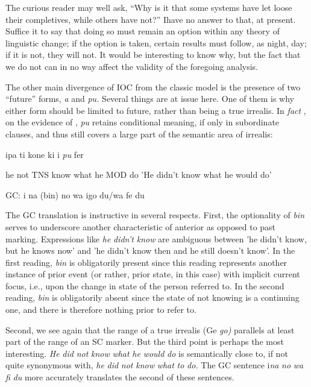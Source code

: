 The curious reader may well ask, ``Why is it that some systems
have let loose their completives, while others have not?'' Ihave no answer to that, at present. Suffice it to say that doing so must remain an option within any theory of linguistic change; if the option is taken, certain results must follow, as night, day; if it is not, they will not. It would be interesting to know why, but the fact that we do not can in no way affect the validity of the foregoing analysis.


The other main divergence of IOC from the classic model is the presence of two ``future'' forms, \textit{a} and \textit{pu.} Several things are at issue here. One of them is why either form should be limited to future, rather than being a true irrealis. In \textit{fact} , on the evidence of \citet[103]{Corne1977}, \textit{pu} retains conditional meaning, if only in subordinate clauses, and thus still covers a large part of the semantic area of ir\-realis:

\ea\label{ex:118}
 ipa ti kone ki i \textit{pu} fer
\glt
\z

he not TNS know what he MOD do 'He didn't know what he would do'

\ea\label{ex:119}
 GC: i na (bin) no wa igo du/wa fe du
\glt
\z

The GC translation is instructive in several respects. First, the optionality of \textit{bin} serves to underscore another characteristic of ante\-rior as opposed to past marking. Expressions like \textit{he} \textit{didn't} \textit{know} are ambiguous between 'he didn't know, but he knows now' and 'he didn't know then and he still doesn't know'. In the first reading, \textit{bin} is obli\-gatorily present since this reading represents another instance of prior event (or rather, prior state, in this case) with implicit current focus, i.e., upon the change in state of the person referred to. In the second reading, \textit{bin} is obligatorily absent since the state of not knowing is a continuing one, and there is therefore nothing prior to refer to.

Second, we see again that the range of a true irrealis (Ge \textit{go}\textit{)} parallels at least part of the range of an SC marker. But the third point is perhaps the most interesting. \textit{He }\textit{did} \textit{not} \textit{know} \textit{what} \textit{he} \textit{would} \textit{do }is semantically close to, if not quite synonymous with, \textit{he} \textit{did} \textit{not} \textit{know}
\textit{what} \textit{to} \textit{do.} The GC sentence i\textit{na} \textit{no} \textit{wa} \textit{fi} \textit{du} more accurately translates the second of these sentences.


